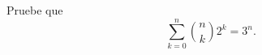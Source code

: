 \begin{statement}{20}
  Pruebe que
  \[
    \sum_{k = 0}^n \binom{n}{k} 2^k = 3^n.  
  \]
\end{statement}